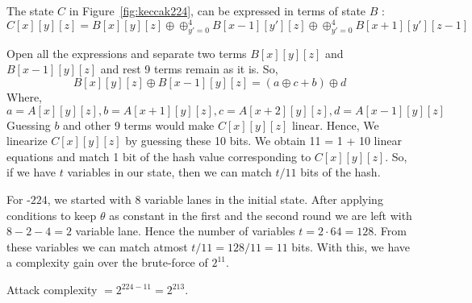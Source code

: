 The state $C$ in Figure~\ref{fig:keccak224}, can be expressed in terms of state $B$ :
\[
C[x][y][z] = B[x][y][z] \oplus \oplus_{y' = 0}^{4} B[x-1][y'][z] \oplus \oplus_{y' = 0}^{4} B[x+1][y'][z-1]
\]

Open all the expressions and separate two terms $B[x][y][z]$ and $B[x-1][y][z]$ and rest 9 terms remain as it is.
So, \[ B[x][y][z] \oplus B[x-1][y][z] = (a \oplus c + b) \oplus d
\]
Where,
\[
a = A[x][y][z], b = A[x + 1][y][z], c = A[x + 2][y][z], d = A[x - 1][y][z]
\]
Guessing $b$ and other 9 terms would make $C[x][y][z]$ linear. Hence, We linearize $C[x][y][z]$ by guessing these 10 bits. We obtain 11 = 1 + 10 linear equations and match 1 bit of the hash value corresponding to $C[x][y][z]$. So, if we have $t$ variables in our state, then we can match $t/11$ bits of the hash.

For \Keccak-$224$, we started with $8$ variable lanes in the initial state. After applying conditions to keep $\theta$ as constant in the first and the second round we are left with $8 - 2 - 4 = 2$ variable lane. Hence the number of variables $t = 2\cdot 64 = 128$. From these variables we can match atmost $t/11 = 128/11 = 11$ bits. 
With this, we have a complexity gain over the brute-force of $2^{11}$.

Attack complexity $ = 2^{224 - 11} = 2^{213}$.